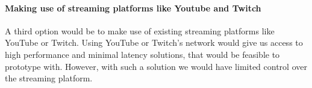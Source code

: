 

\paragraph{Making use of streaming platforms like Youtube and Twitch}
A third option would be to make use of existing streaming platforms like YouTube or Twitch. Using YouTube or Twitch's network would give us access to high performance and minimal latency solutions, that would be feasible to prototype with. However, with such a solution we would have limited control over the streaming platform.


        
